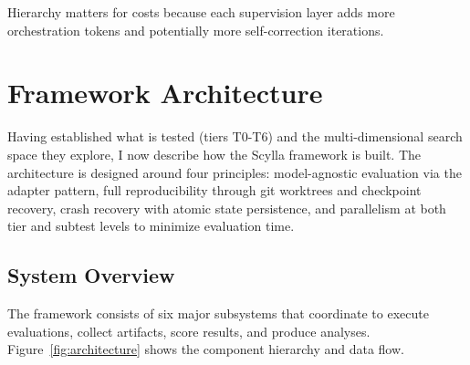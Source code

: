 \documentclass[11pt]{article}
\begin{document}
Hierarchy matters for costs because each supervision layer adds more
orchestration tokens and potentially more self-correction iterations.

\section{Framework Architecture}\label{sec:architecture}

Having established what is tested (tiers T0-T6) and the multi-dimensional search space they explore, I now describe how the Scylla framework is built. The architecture is designed around four principles: model-agnostic evaluation via the adapter pattern, full reproducibility through git worktrees and checkpoint recovery, crash recovery with atomic state persistence, and parallelism at both tier and subtest levels to minimize evaluation time.

\subsection{System Overview}\label{sec:system-overview}

The framework consists of six major subsystems that coordinate to execute evaluations, collect artifacts, score results, and produce analyses. Figure~\ref{fig:architecture} shows the component hierarchy and data flow.
\end{document}
